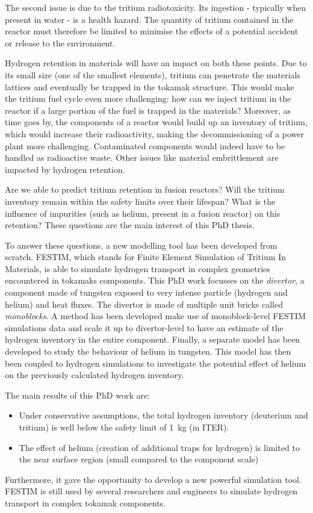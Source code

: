 The second issue is due to the tritium radiotoxicity.
Its ingestion - typically when present in water - is a health hazard.
The quantity of tritium contained in the reactor must therefore be limited to minimise the effects of a potential accident or release to the environment.

Hydrogen retention in materials will have an impact on both these points.
Due to its small size (one of the smallest elements), tritium can penetrate the materials lattices and eventually be trapped in the tokamak structure.
This would make the tritium fuel cycle even more challenging: how can we inject tritium in the reactor if a large portion of the fuel is trapped in the materials?
Moreover, as time goes by, the components of a reactor would build up an inventory of tritium, which would increase their radioactivity, making the decommissioning of a power plant more challenging.
Contaminated components would indeed have to be handled as radioactive waste.
Other issues like material embrittlement are impacted by hydrogen retention.

Are we able to predict tritium retention in fusion reactors?
Will the tritium inventory remain within the safety limits over their lifespan?
What is the influence of impurities (such as helium, present in a fusion reactor) on this retention?
These questions are the main interest of this PhD thesis.

To answer these questions, a new modelling tool has been developed from scratch.
FESTIM, which stands for Finite Element Simulation of Tritium In Materials, is able to simulate hydrogen transport in complex geometries encountered in tokamaks components.
This PhD work focusses on the \textit{divertor}, a component made of tungsten exposed to very intense particle (hydrogen and helium) and heat fluxes. 
The divertor is made of multiple unit bricks called \textit{monoblocks}.
A method has been developed make use of monoblock-level FESTIM simulations data and scale it up to divertor-level to have an estimate of the hydrogen inventory in the entire component.
Finally, a separate model has been developed to study the behaviour of helium in tungsten.
This model has then been coupled to hydrogen simulations to investigate the potential effect of helium on the previously calculated hydrogen inventory.

The main results of this PhD work are:
\begin{itemize}
    \item Under conservative assumptions, the total hydrogen inventory (deuterium and tritium) is well below the safety limit of \SI{1}{kg} (in ITER).
    \item The effect of helium (creation of additional traps for hydrogen) is limited to the near surface region (small compared to the component scale)
\end{itemize}

Furthermore, it gave the opportunity to develop a new powerful simulation tool.
FESTIM is still used by several researchers and engineers to simulate hydrogen transport in complex tokamak components.
